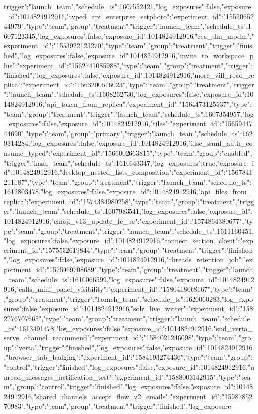 {trigger":"launch_team","schedule_ts":1607552421,"log_exposures":false,"exposure_id":1014824912916},"typed_api_enterprise_setphoto":{"experiment_id":"1552065244979","type":"team","group":"treatment","trigger":"launch_team","schedule_ts":1607123345,"log_exposures":false,"exposure_id":1014824912916},"cea_dm_mpdm":{"experiment_id":"1553922123270","type":"team","group":"treatment","trigger":"finished","log_exposures":false,"exposure_id":1014824912916},"invite_to_workspace_plus":{"experiment_id":"1562741085988","type":"team","group":"treatment","trigger":"finished","log_exposures":false,"exposure_id":1014824912916},"more_vifl_read_replica":{"experiment_id":"1563200516023","type":"team","group":"treatment","trigger":"launch_team","schedule_ts":1608262730,"log_exposures":false,"exposure_id":1014824912916},"api_token_from_replica":{"experiment_id":"1564473125537","type":"team","group":"treatment","trigger":"launch_team","schedule_ts":1607354957,"log_exposures":false,"exposure_id":1014824912916},"tiles":{"experiment_id":"1565944744690","type":"team","group":"primary","trigger":"launch_team","schedule_ts":1629314284,"log_exposures":false,"exposure_id":1014824912916},"idsc_saml_auth_consume_typed":{"experiment_id":"1566002663815","type":"team","group":"enabled","trigger":"hash_team","schedule_ts":1610643347,"log_exposures":true,"exposure_id":1014824912916},"desktop_nested_lists_composition":{"experiment_id":"1567841211187","type":"team","group":"treatment","trigger":"launch_team","schedule_ts":1612803478,"log_exposures":false,"exposure_id":1014824912916},"api_files_from_replica":{"experiment_id":"1574384980258","type":"team","group":"treatment","trigger":"launch_team","schedule_ts":1607983541,"log_exposures":false,"exposure_id":1014824912916},"emoji_v13_update_fe_be":{"experiment_id":"1574864380677","type":"team","group":"treatment","trigger":"launch_team","schedule_ts":1611160451,"log_exposures":false,"exposure_id":1014824912916},"connect_section_client":{"experiment_id":"1575552619844","type":"team","group":"treatment","trigger":"finished","log_exposures":false,"exposure_id":1014824912916},"threads_retention_job":{"experiment_id":"1575969708689","type":"team","group":"treatment","trigger":"launch_team","schedule_ts":1610066599,"log_exposures":false,"exposure_id":1014824912916},"calls_mini_panel_visibility":{"experiment_id":"1580418068167","type":"team","group":"treatment","trigger":"launch_team","schedule_ts":1620060283,"log_exposures":false,"exposure_id":1014824912916},"solr_live_writer":{"experiment_id":"1582276707665","type":"team","group":"treatment","trigger":"launch_team","schedule_ts":1613491478,"log_exposures":false,"exposure_id":1014824912916},"snd_verta_serve_channel_recommend":{"experiment_id":"1584021246098","type":"team","group":"verta","trigger":"finished","log_exposures":false,"exposure_id":1014824912916},"browser_tab_badging":{"experiment_id":"1584193274436","type":"team","group":"control","trigger":"finished","log_exposures":false,"exposure_id":1014824912916},"unread_messages_notification_test":{"experiment_id":"1588003142915","type":"team","group":"control","trigger":"finished","log_exposures":false,"exposure_id":1014824912916},"shared_channels_accept_flow_v2_emails":{"experiment_id":"1598785270983","type":"team","group":"treatment","trigger":"finished","log_exposure}
